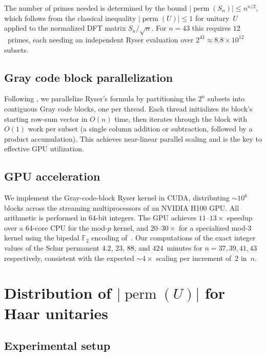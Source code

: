 \documentclass[11pt]{amsart}
\theoremstyle{definition}
\theoremstyle{remark}
\DeclareMathOperator{\perm}{perm}
\begin{document}
The number of primes needed is determined by the bound
$|\perm(S_n)|\le n^{n/2}$, which follows from the classical inequality
$|\perm(U)|\le 1$ for unitary~$U$ \cite{Minc78} applied to the
normalized DFT matrix $S_n/\sqrt{n}$.
For $n=43$ this requires $12$~primes, each needing an independent
Ryser evaluation over $2^{43}\approx 8.8\times 10^{12}$ subsets.

\subsection{Gray code block parallelization}

Following \cite{BipedalF2}, we parallelize Ryser's formula by
partitioning the $2^n$ subsets into contiguous Gray code blocks, one
per thread.  Each thread initializes its block's starting row-sum
vector in $O(n)$ time, then iterates through the block with $O(1)$
work per subset (a single column addition or subtraction, followed by
a product accumulation).  This achieves near-linear parallel scaling
and is the key to effective GPU utilization.

\subsection{GPU acceleration}

We implement the Gray-code-block Ryser kernel in CUDA, distributing
$\sim\!10^6$ blocks across the streaming multiprocessors of an NVIDIA
H100 GPU.  All arithmetic is performed in 64-bit integers.  The GPU
achieves $11$--$13\times$ speedup over a 64-core CPU for the mod-$p$
kernel, and $20$--$30\times$ for a specialized mod-$3$ kernel using
the bipedal $\mathbb{F}_2$ encoding of~\cite{BipedalF2}. Our computations of the exact integer values of the Schur permanent  $4.2$, $23$, $88$, and
$424$~minutes for $n=37,39,41,43$ respectively, consistent with the
expected $\sim 4\times$ scaling per increment of~$2$ in~$n$.


%

\section{Distribution of $|\perm(U)|$ for Haar unitaries}
\label{sec:distribution}

\subsection{Experimental setup}
\end{document}

